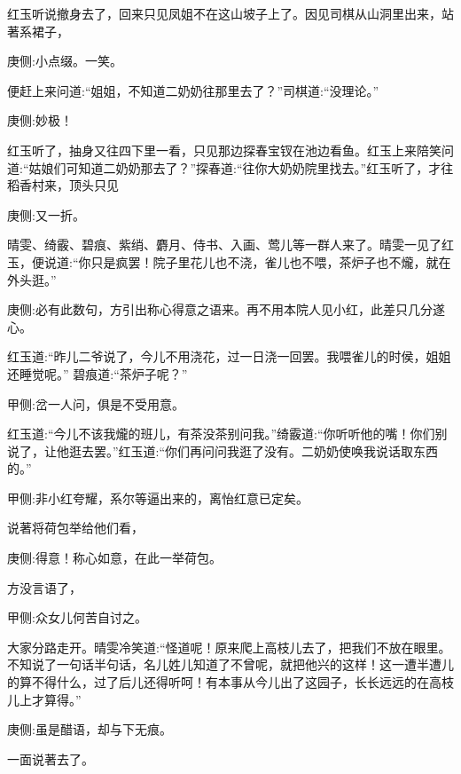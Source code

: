 \begin{parag}
    红玉听说撤身去了，回来只见凤姐不在这山坡子上了。因见司棋从山洞里出来，站著系裙子，\begin{note}庚侧:小点缀。一笑。\end{note}便赶上来问道:“姐姐，不知道二奶奶往那里去了？”司棋道:“没理论。”\begin{note}庚侧:妙极！\end{note}红玉听了，抽身又往四下里一看，只见那边探春宝钗在池边看鱼。红玉上来陪笑问道:“姑娘们可知道二奶奶那去了？”探春道:“往你大奶奶院里找去。”红玉听了，才往稻香村来，顶头只见\begin{note}庚侧:又一折。\end{note} 晴雯、绮霰、碧痕、紫绡、麝月、侍书、入画、莺儿等一群人来了。晴雯一见了红玉，便说道:“你只是疯罢！院子里花儿也不浇，雀儿也不喂，茶炉子也不爖，就在外头逛。”\begin{note}庚侧:必有此数句，方引出称心得意之语来。再不用本院人见小红，此差只几分遂心。\end{note} 红玉道:“昨儿二爷说了，今儿不用浇花，过一日浇一回罢。我喂雀儿的时侯，姐姐还睡觉呢。” 碧痕道:“茶炉子呢？”\begin{note}甲侧:岔一人问，俱是不受用意。\end{note}红玉道:“今儿不该我爖的班儿，有茶没茶别问我。”绮霰道:“你听听他的嘴！你们别说了，让他逛去罢。”红玉道:“你们再问问我逛了没有。二奶奶使唤我说话取东西的。”\begin{note}甲侧:非小红夸耀，系尔等逼出来的，离怡红意已定矣。\end{note}说著将荷包举给他们看，\begin{note}庚侧:得意！称心如意，在此一举荷包。\end{note}方没言语了， \begin{note}甲侧:众女儿何苦自讨之。\end{note}大家分路走开。晴雯冷笑道:“怪道呢！原来爬上高枝儿去了，把我们不放在眼里。不知说了一句话半句话，名儿姓儿知道了不曾呢，就把他兴的这样！这一遭半遭儿的算不得什么，过了后儿还得听呵！有本事从今儿出了这园子，长长远远的在高枝儿上才算得。”\begin{note}庚侧:虽是醋语，却与下无痕。\end{note}一面说著去了。
\end{parag}



